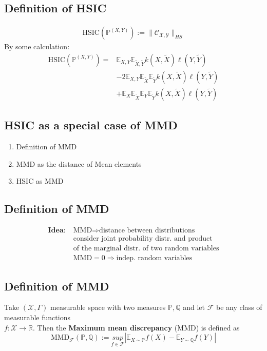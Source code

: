 \clearpage

\subsection*{Definition of HSIC}
\begin{align*}
\text{HSIC}(\mathbb{P}^{(X,Y)}):=\|\mathcal{C}_{\mathcal{X},\mathcal{Y}}\|_{HS}
\end{align*}
By some calculation:
\begin{align*}
\text{HSIC}(\mathbb{P}^{(X,Y)})=&
\mathbb{E}_{X,Y}\mathbb{E}_{\tilde X,\tilde Y}k(X,\tilde X)\ell (Y,\tilde Y)\\&-2\mathbb{E}_{X,Y}\mathbb{E}_{\tilde X}\mathbb{E}_{\tilde Y}k(X,\tilde X)\ell (Y,\tilde Y)\\&+\mathbb{E}_X\mathbb{E}_{\tilde X}\mathbb{E}_Y\mathbb{E}_{\tilde Y}k(X,\tilde X)\ell (Y,\tilde Y)
\end{align*}

\clearpage

\subsection{HSIC as a special case of MMD}
\begin{enumerate}
\item Definition of MMD
\item MMD as the distance of Mean elements
\item HSIC as MMD
\end{enumerate}

\clearpage

\subsection*{Definition of MMD}

\begin{align*}
\textbf{Idea:}\;& \text{MMD}\Rightarrow\text{distance between distributions}\\&\text{consider joint probability distr. and product}\\& \text{of the marginal distr. of two random variables}\\&\text{MMD}=0\Rightarrow\text{indep. random variables}
\end{align*}

\clearpage

\subsection*{Definition of MMD}
Take $(\mathcal{X},\Gamma)$ measurable space with two measures $\mathbb{P},\mathbb{Q}$ and let $\mathcal{F}$ be any class of measurable functions\\ $f:\mathcal X\rightarrow\mathbb{R}$. Then the \textbf{Maximum mean discrepancy} (MMD) is defined as
\begin{equation*}
\text{MMD}_\mathcal{F}(\mathbb{P},\mathbb{Q}):=\underset{f\in\mathcal{F}}{sup}|\mathbb E_{X\sim\mathbb P}f(X)-\mathbb E_{Y\sim\mathbb Q}f(Y)|
\end{equation*}

